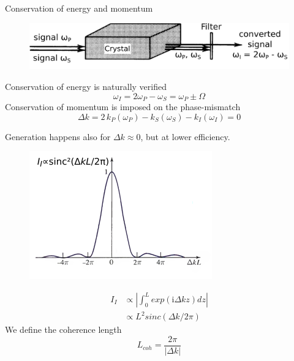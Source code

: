 \documentclass[11pt, leqno]{beamer}
\begin{document}
\begin{frame}{Conservation of energy and momentum}
	\begin{figure}
		\centering
		\vspace{10pt}
		\includegraphics[width=.8\textwidth]{setup_b&w.png}
	\end{figure}
	Conservation of energy is naturally verified
	\begin{equation}
		\omega_I = 2\omega_P - \omega_S = \omega_P \pm \Omega
		\label{eq_energy}
	\end{equation}
	Conservation of momentum is imposed on the phase-mismatch
	\begin{equation}
		\Delta k = 2\,k_P(\omega_P) - k_S(\omega_S) -k_I(\omega_I) = 0
		\label{eq_momentum}
	\end{equation}
\end{frame}
\begin{frame}
	Generation happens also for $\Delta k \approx 0$, but at lower efficiency.
	\begin{figure}
		\vspace{10pt}
		\centering
	    \includegraphics[width=.5\textwidth]{sinc2.png}
	\end{figure}
	\begin{equation}
	\begin{split}
		I_I &\propto \left| \int_0^L exp(\mathrm{i}\Delta k z)dz\right| \\
			&\propto L^2 sinc(\Delta k / 2\pi)
	\end{split}
	\end{equation}
	We define the coherence length
	\begin{equation}
		L_{coh} = \frac{2\pi}{|\Delta k|}
	\label{eq_coherence_length}
	\end{equation}
\end{frame}
\end{document}
